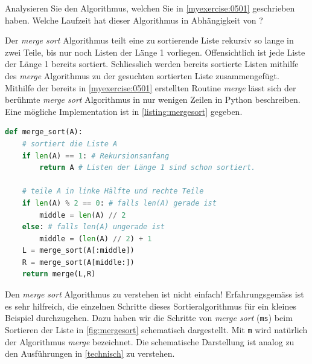 \begin{myexercise}\label{myexercise:0502}
	Analysieren Sie den Algorithmus, welchen Sie in \cref{myexercise:0501} geschrieben haben. Welche Laufzeit hat dieser Algorithmus in Abhängigkeit von ?
\end{myexercise}
Der \textit{merge sort} Algorithmus teilt eine zu sortierende Liste rekursiv so lange in zwei Teile, bis nur noch Listen der Länge 1 vorliegen. Offensichtlich ist jede Liste der Länge 1 bereits sortiert. Schliesslich werden bereits sortierte Listen mithilfe des \textit{merge} Algorithmus zu der gesuchten sortierten Liste zusammengefügt. Mithilfe der bereits in \cref{myexercise:0501} erstellten Routine \textit{merge} lässt sich der berühmte \textit{merge sort} Algorithmus in nur wenigen Zeilen in Python beschreiben. Eine mögliche Implementation ist in \cref{listing:mergesort} gegeben.
\begin{lstlisting}[language=Python,caption=Implementation der Funktion \pythoninline{merge_sort},label=listing:mergesort]
def merge_sort(A):
    # sortiert die Liste A
    if len(A) == 1: # Rekursionsanfang
        return A # Listen der Länge 1 sind schon sortiert.

    # teile A in linke Hälfte und rechte Teile
    if len(A) % 2 == 0: # falls len(A) gerade ist
        middle = len(A) // 2
    else: # falls len(A) ungerade ist
        middle = (len(A) // 2) + 1
    L = merge_sort(A[:middle])
    R = merge_sort(A[middle:])
    return merge(L,R)
\end{lstlisting}
Den \textit{merge sort} Algorithmus zu verstehen ist nicht einfach! Erfahrungsgemäss ist es sehr hilfreich, die einzelnen Schritte dieses Sortieralgorithmus für ein kleines Beispiel durchzugehen. Dazu haben wir die Schritte von \textit{merge sort} (\verb|ms|) beim Sortieren der Liste \pythoninline{[3,2,1]} in \cref{fig:mergesort} schematisch dargestellt. Mit \verb|m| wird natürlich der Algorithmus \textit{merge} bezeichnet. Die schematische Darstellung ist analog zu den Ausführungen in \cref{technisch} zu verstehen.

